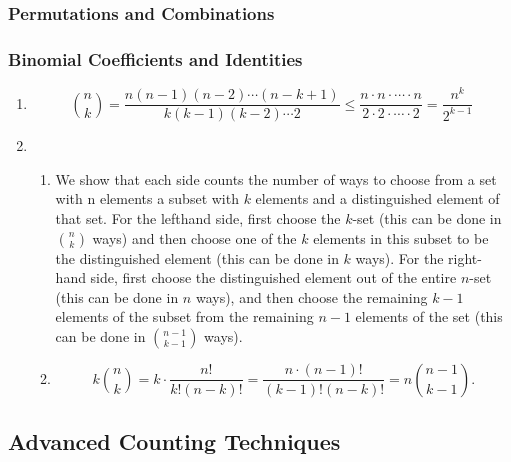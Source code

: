 \documentclass{sig-alternate-05-2015}
\begin{document}
\subsubsection{Permutations and Combinations}
\subsubsection{Binomial Coefficients and Identities}
\begin{enumerate}
	\item \begin{equation}
	\binom{n}{k} = \frac{n(n - 1)(n - 2) \cdots (n - k + 1)}{k(k - 1)(k - 2) \cdots 2} \le \frac{n \cdot n \cdot \cdots \cdot n}{2 \cdot 2 \cdot \cdots \cdot 2} = \frac{n^k}{2^{k - 1}}
	\end{equation}
	
	\item \begin{enumerate}
		\item We show that each side counts the number of ways
		to choose from a set with n elements a subset with $k$ elements
		and a distinguished element of that set. For the lefthand
		side, first choose the $k$-set (this can be done in $\binom{n}{k}$ ways)
		and then choose one of the $k$ elements in this subset to be
		the distinguished element (this can be done in $k$ ways). For
		the right-hand side, first choose the distinguished element out
		of the entire $n$-set (this can be done in $n$ ways), and then
		choose the remaining $k - 1$ elements of the subset from the
		remaining $n - 1$ elements of the set (this can be done in $\binom{n - 1}{k - 1}$ ways).
		\item \begin{equation}
			k \binom{n}{k} = k \cdot \frac{n!}{k!(n - k)!} = \frac{n \cdot (n - 1)!}{(k - 1)!(n - k)!} = n \binom{n - 1}{k - 1}.
		\end{equation}
	\end{enumerate}
	
\end{enumerate}

\subsection{Advanced Counting Techniques}
\end{document}
